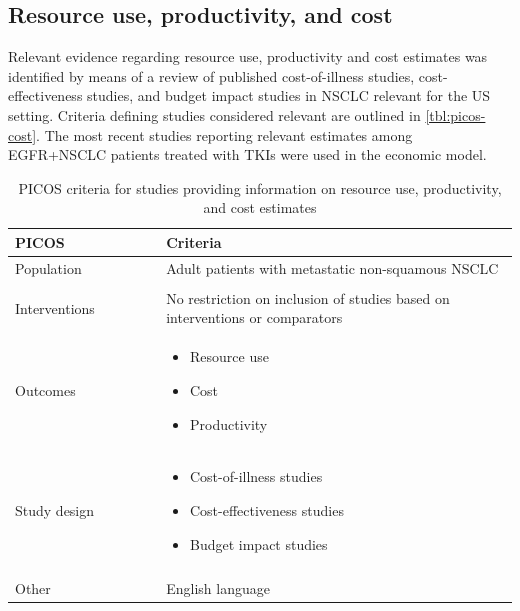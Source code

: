 \documentclass[11pt,final,fleqn]{article}\usepackage[]{graphicx}\usepackage[]{color}
\theoremstyle{plain}
\begin{document}
\begin{appendices}
\subsection{Resource use, productivity, and cost}
Relevant evidence regarding resource use, productivity and cost estimates was identified by means of a review of published cost-of-illness studies, cost-effectiveness studies, and budget impact studies in NSCLC relevant for the US setting. Criteria defining studies considered relevant are outlined in \autoref{tbl:picos-cost}. The most recent studies reporting relevant estimates among EGFR+NSCLC patients treated with TKIs were used in the economic model.

\begin{table}[!ht]
\begin{center}
\begin{threeparttable}
\caption{PICOS criteria for studies providing information on resource use, productivity, and cost estimates} \label{tbl:picos-cost}
\begin{tabular}{p{0.3\linewidth}p{0.7\linewidth}}
\hline
\multicolumn{1}{l}{PICOS} &  \multicolumn{1}{l}{Criteria}\\
\hline
Population & Adult patients with metastatic non-squamous NSCLC\\
&\\
Interventions & No restriction on inclusion of studies based on interventions or comparators\\
Outcomes & 
\begin{itemize}
\item Resource use
\item Cost
\item Productivity
\end{itemize} \\
Study design &  
\begin{itemize}
\item Cost-of-illness studies
\item Cost-effectiveness studies
\item Budget impact studies
\end{itemize} \\
&\\
Other & 
English language\\
\hline
\end{tabular}
\end{threeparttable}
\end{center}
\end{table}


\end{appendices}
\end{document}

